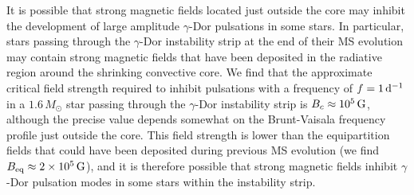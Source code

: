 It is possible that strong magnetic fields located just outside the core may inhibit the development of large amplitude $\gamma$-Dor pulsations in some stars. In particular, stars passing through the $\gamma$-Dor instability strip at the end of their MS evolution may contain strong magnetic fields that have been deposited in the radiative region around the shrinking convective core. We find that the approximate critical field strength required to inhibit pulsations with a frequency of $f = 1 \, {\rm d}^{-1}$ in a $1.6 \, M_\odot$ star passing through the $\gamma$-Dor instability strip is $B_c \approx 10^5 \, {\rm G}$, although the precise value depends somewhat on the Brunt-Vaisala frequency profile just outside the core. This field strength is lower than the equipartition fields that could have been deposited during previous MS evolution (we find $B_{\rm eq} \approx 2 \times 10^5 \, {\rm G}$), and it is therefore possible that strong magnetic fields inhibit $\gamma$-Dor pulsation modes in some stars within the instability strip.


  
  
  
  
  
  
  
  
  
  
  
  
  
  
  